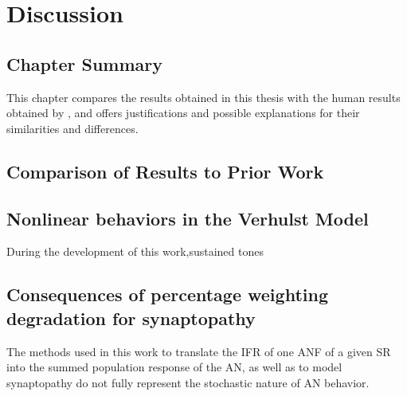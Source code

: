 \chapter{Discussion}
\label{chapter:Discussion}
\thispagestyle{myheadings}

\graphicspath{{6_Discussion/Figures/}}
\section{Chapter Summary} %
\label{sec:discussion_summary}
This chapter compares the results obtained in this thesis with the human results obtained by \citeauthor{Mehraei2016Auditory}, and offers justifications and possible explanations for their similarities and differences.

\section{Comparison of Results to Prior Work} %
\label{sec:comparison_of_results_to_prior_work}


\section{Nonlinear behaviors in the Verhulst Model} %
\label{sec:nonlinear_behaviors_in_the_verhulst_model}
During the development of this work,sustained tones 

\section{Consequences of percentage weighting degradation for synaptopathy} %
\label{sec:consequences_of_percentage_weighting_degradation_for_synaptopathy}
The methods used in this work to translate the IFR of one ANF of a given SR into the summed population response of the AN, as well as to model synaptopathy do not fully represent the stochastic nature of AN behavior. 
